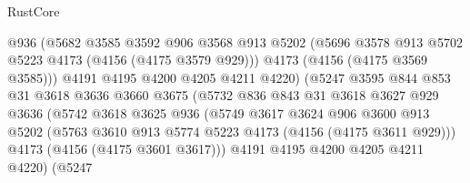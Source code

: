 \begin{lexlean}{RustCore}
\begin{coremodule}
                                @936
                                (@5682
                                  @3585
                                  @3592
                                  @906
                                  @3568
                                  @913
                                  @5202
                                  (@5696 @3578 @913 @5702 @5223 @4173 (@4156 (@4175 @3579 @929)))
                                  @4173
                                  (@4156 (@4175 @3569 @3585)))
                                @4191
                                @4195
                                @4200
                                @4205
                                @4211
                                @4220)
                              (@5247
                                @3595
                                @844
                                @853
                                @31
                                @3618
                                @3636
                                @3660
                                @3675
                                (@5732
                                  @836
                                  @843
                                  @31
                                  @3618
                                  @3627
                                  @929
                                  @3636
                                  (@5742
                                    @3618
                                    @3625
                                    @936
                                    (@5749
                                      @3617
                                      @3624
                                      @906
                                      @3600
                                      @913
                                      @5202
                                      (@5763
                                        @3610
                                        @913
                                        @5774
                                        @5223
                                        @4173
                                        (@4156 (@4175 @3611 @929)))
                                      @4173
                                      (@4156 (@4175 @3601 @3617)))
                                    @4191
                                    @4195
                                    @4200
                                    @4205
                                    @4211
                                    @4220)
                                  (@5247

\end{coremodule}
\end{lexlean}
